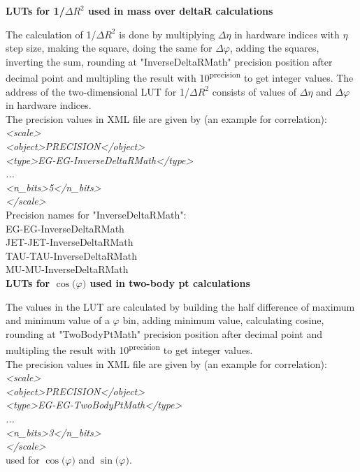 \textbf{LUTs for 1/$\Delta$$R^2$ used in mass over deltaR calculations}
\label{sec:gtl:calc_luts_inverse_deltaR}

The calculation of 1/$\Delta$$R^2$ is done by multiplying $\Delta\eta$ in hardware indices with $\eta$ step size, making the square, doing the same for $\Delta\varphi$,
adding the squares, inverting the sum, rounding at "InverseDeltaRMath" precision position after decimal point and multipling the result with 10\textsuperscript{\tiny{precision}} to get integer values.
The address of the two-dimensional LUT for 1/$\Delta$$R^2$ consists of values of $\Delta\eta$ and $\Delta\varphi$ in hardware indices.\\

The precision values in XML file are given by (an example for \egamma \egamma correlation):\\
\textit{<scale>\\
    <object>PRECISION</object>\\
    <type>EG-EG-InverseDeltaRMath</type>\\
    ...\\
    <n\_bits>5</n\_bits>\\
</scale>}\\

Precision names for "InverseDeltaRMath":\\
EG-EG-InverseDeltaRMath\\
JET-JET-InverseDeltaRMath\\
TAU-TAU-InverseDeltaRMath\\
MU-MU-InverseDeltaRMath\\

\textbf{LUTs for $\cos($$\varphi$$)$ used in two-body pt calculations}
\label{sec:gtl:calc_luts_cos_phi}

The values in the LUT are calculated by building the half difference of maximum and minimum value of a $\varphi$ bin, adding minimum value, calculating cosine, rounding at "TwoBodyPtMath" precision position after decimal point and multipling the result with 10\textsuperscript{\tiny{precision}} to get integer values.\\

The precision values in XML file are given by (an example for \egamma \egamma correlation):\\
\textit{<scale>\\
    <object>PRECISION</object>\\
    <type>EG-EG-TwoBodyPtMath</type>\\
    ...\\
    <n\_bits>3</n\_bits>\\
</scale>}\\
used for $\cos($$\varphi$$)$ and $\sin($$\varphi$$)$.\\

